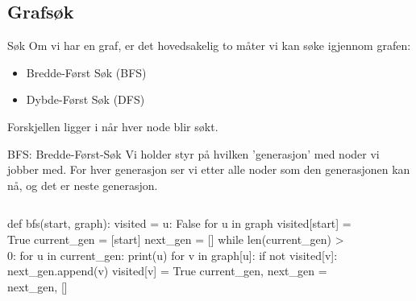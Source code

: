 \subsection*{Grafsøk}
\begin{frame}{Søk}
    Om vi har en graf, er det hovedsakelig to måter vi kan søke igjennom grafen: 
    \begin{itemize}
        \item Bredde-Først Søk (BFS)
        \item Dybde-Først Søk (DFS)
    \end{itemize}
    Forskjellen ligger i når hver node blir søkt.
\end{frame}

\begin{frame}[fragile]{BFS: Bredde-Først-Søk}
    Vi holder styr på hvilken 'generasjon' med noder vi jobber med. For hver generasjon ser vi etter alle noder som den generasjonen kan nå, og det er neste generasjon.
    \begin{columns}
        \begin{column}{0.67\textwidth}
            \begin{python}
def bfs(start, graph):
    visited = { u: False for u in graph }
    visited[start] = True
    current_gen = [start]
    next_gen = []
    while len(current_gen) > 0:
        for u in current_gen:
            print(u)
            for v in graph[u]:
                if not visited[v]:
                    next_gen.append(v)
                    visited[v] = True
        current_gen, next_gen = next_gen, []
            \end{python}
        \end{column}
        \begin{column}{0.35\textwidth}
            \begin{figure}
                \centering
                \includegraphics[height=4cm]{images/bfs.png}
            \end{figure}   
        \end{column}
    \end{columns}
\end{frame}

